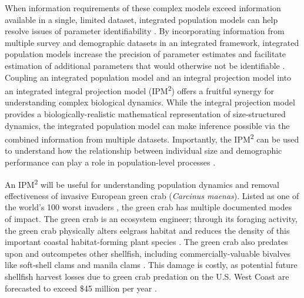 \documentclass{article}
\begin{document}
When information requirements of these complex models exceed information available in a single, limited dataset, integrated population models can help resolve issues of parameter identifiability \parencite{besbeas2002integrating}. By incorporating information from multiple survey and demographic datasets in an integrated framework, integrated population models increase the precision of parameter estimates and facilitate estimation of additional parameters that would otherwise not be identifiable \parencite{riecke2019integrated, abadi2010assessment}. Coupling an integrated population model and an integral projection model into an integrated integral projection model (IPM\textsuperscript{2}) offers a fruitful synergy for understanding complex biological dynamics. While the integral projection model provides a biologically-realistic mathematical representation of size-structured dynamics, the integrated population model can make inference possible via the combined information from multiple datasets. Importantly, the IPM\textsuperscript{2} can be used to understand how the relationship between individual size and demographic performance can play a role in population-level processes \parencite{plard2019ipm}.

An IPM\textsuperscript{2} will be useful for understanding population dynamics and removal effectiveness of invasive European green crab (\textit{Carcinus maenas}). Listed as one of the world’s 100 worst invaders \parencite{lowe2000100}, the green crab has multiple documented modes of impact. The green crab is an ecosystem engineer; through its foraging activity, the green crab physically alters eelgrass habitat and reduces the density of this important coastal habitat-forming plant species \parencite{garbary2014drastic, howard2019habitat}. The green crab also predates upon and outcompetes other shellfish, including commercially-valuable bivalves like soft-shell clams and manila clams \parencite{grosholz2000impacts, fisher2024invasive}. This damage is costly, as potential future shellfish harvest losses due to green crab predation on the U.S. West Coast are forecasted to exceed \$45 million per year \parencite{grosholz2011modeling}. 
\end{document}
